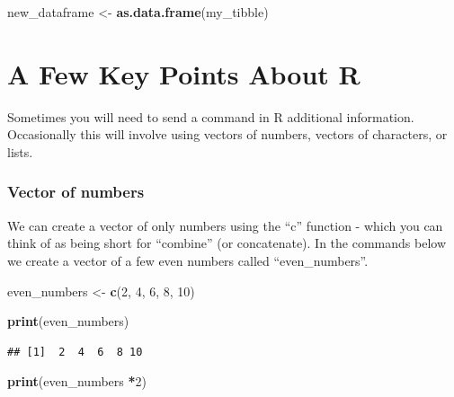 \documentclass[
]{krantz}
\makeatletter
\newenvironment{Shaded}{\begin{snugshade}}{\end{snugshade}}
\newcommand{\DecValTok}[1]{\textcolor[rgb]{0.06,0.06,0.06}{#1}}
\newcommand{\KeywordTok}[1]{\textcolor[rgb]{0.27,0.27,0.27}{\textbf{#1}}}
\newcommand{\NormalTok}[1]{#1}
\newcommand{\OperatorTok}[1]{\textcolor[rgb]{0.43,0.43,0.43}{\textbf{#1}}}
\newcommand{\StringTok}[1]{\textcolor[rgb]{0.5,0.5,0.5}{#1}}
\newenvironment{kframe}{%
\medskip{}
\setlength{\fboxsep}{.8em}
 \def\at@end@of@kframe{}%
 \ifinner\ifhmode%
  \def\at@end@of@kframe{\end{minipage}}%
  \begin{minipage}{\columnwidth}%
 \fi\fi%
 \def\FrameCommand##1{\hskip\@totalleftmargin \hskip-\fboxsep
 \colorbox{shadecolor}{##1}\hskip-\fboxsep
     \hskip-\linewidth \hskip-\@totalleftmargin \hskip\columnwidth}%
 \MakeFramed {\advance\hsize-\width
   \@totalleftmargin\z@ \linewidth\hsize
   \@setminipage}}%
 {\par\unskip\endMakeFramed%
 \at@end@of@kframe}
\renewenvironment{Shaded}{\begin{kframe}}{\end{kframe}}
\makeatother
\begin{document}
\begin{Shaded}
\begin{Highlighting}[]
\NormalTok{new_dataframe <-}\StringTok{ }\KeywordTok{as.data.frame}\NormalTok{(my_tibble)}
\end{Highlighting}
\end{Shaded}

\hypertarget{a-few-key-points-about-r}{%
\section{A Few Key Points About R}\label{a-few-key-points-about-r}}

Sometimes you will need to send a command in R additional information. Occasionally this will involve using vectors of numbers, vectors of characters, or lists.

\hypertarget{vector-of-numbers}{%
\subsubsection{Vector of numbers}\label{vector-of-numbers}}

We can create a vector of only numbers using the ``c'' function - which you can think of as being short for ``combine'' (or concatenate). In the commands below we create a vector of a few even numbers called ``even\_numbers''.

\begin{Shaded}
\begin{Highlighting}[]
\NormalTok{even_numbers <-}\StringTok{ }\KeywordTok{c}\NormalTok{(}\DecValTok{2}\NormalTok{, }\DecValTok{4}\NormalTok{, }\DecValTok{6}\NormalTok{, }\DecValTok{8}\NormalTok{, }\DecValTok{10}\NormalTok{)}
\end{Highlighting}
\end{Shaded}

\begin{Shaded}
\begin{Highlighting}[]
\KeywordTok{print}\NormalTok{(even_numbers)}
\end{Highlighting}
\end{Shaded}

\begin{verbatim}
## [1]  2  4  6  8 10
\end{verbatim}

\begin{Shaded}
\begin{Highlighting}[]
\KeywordTok{print}\NormalTok{(even_numbers }\OperatorTok{*}\DecValTok{2}\NormalTok{)}
\end{Highlighting}
\end{Shaded}
\end{document}
